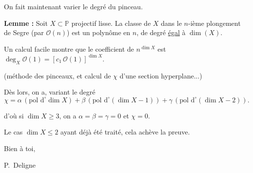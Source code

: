 \documentclass[11pt,a4paper]{article}
\theoremstyle{plain}
\theoremstyle{definition}
\begin{document}
On fait maintenant varier le degr\'e du pinceau.

\vspace{0.3cm}

\noindent\textbf{Lemme :} Soit $X \subset \mathbb{P}$ projectif lisse. La classe de $X$ dans le $n$-i\`eme plongement de Segre (par $\mathcal{O}(n)$) est un polyn\^ome en $n$, de degr\'e \underline{\'egal} \`a $\dim(X)$.

\vspace{0.5cm}

Un calcul facile montre que le coefficient de $n^{\dim X}$ est $\deg_X \mathcal{O}(1) = [c_1\,\mathcal{O}(1)]^{\dim X}$.

(m\'ethode des pinceaux, et calcul de $\chi$ d'une section hyperplane...)

\vspace{0.5cm}

D\`es lors, on a, variant le degr\'e
\[
\chi = \alpha\,(\text{pol d}^\circ \dim X) + \beta\,(\text{pol d}^\circ (\dim X - 1)) + \gamma\,(\text{pol d}^\circ (\dim X - 2)).
\]

\vspace{0.3cm}

d'o\`u si $\dim X \geq 3$, on a $\alpha = \beta = \gamma = 0$ et $\chi = 0$.

Le cas $\dim X \leq 2$ ayant d\'ej\`a \'et\'e trait\'e, cela ach\`eve la preuve.

\vspace{1cm}

\begin{flushright}
Bien \`a toi,

P.~Deligne
\end{flushright}
\end{document}
